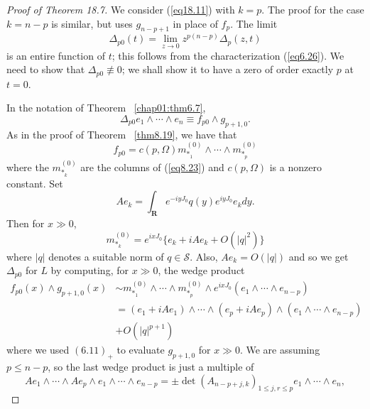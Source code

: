 \documentclass{surv-l}
\theoremstyle{plain}
\theoremstyle{definition}
\numberwithin{equation}{chapter}
\begin{document}
\begin{proof}[Proof of Theorem 18.7]
We consider (\ref{eq18.11}) with $k=p$. The proof for the case $k=n-p$ is similar, but uses $g_{n-p+1}$ in place of $f_{p}$. The limit
\setcounter{equation}{13}
\begin{equation}\label{eq18.14}
\Delta_{p0}(t)=\lim_{z\rightarrow 0}z^{p(n-p)}\Delta_{p}(z,t)
\end{equation}
is an entire function of $t$; this follows from the characterization (\ref{eq6.26}). We need to show that $\Delta_{p0}\not\equiv 0$; we shall show it to have a zero of order exactly $p$ at $t=0$.

In the notation of Theorem ~\ref{chap01:thm6.7},
\begin{equation*}
\Delta_{p0}e_{1}\wedge\cdots\wedge e_{n}\equiv f_{p0}\wedge g_{p+1,0}.
\end{equation*}
As in the proof of Theorem ~\ref{thm8.19}, we have that
\begin{equation*}
f_{p0}=c(p,\Omega)m_{*_{1}}^{(0)}\wedge\cdots\wedge m_{*_{p}}^{(0)}
\end{equation*}
where the $m_{*_{k}}^{(0)}$ are the columns of (\ref{eq8.23}) and $c(p,\Omega)$ is a nonzero constant. Set
\begin{equation}\label{eq18.15}
Ae_{k}=\int_{\mathbf{R}}e^{-iyJ_{0}}q(y)e^{iyJ_{0}}e_{k}dy.
\end{equation}
Then for $x\gg 0$,
\begin{equation*}
m_{*_{k}}^{(0)}=e^{ixJ_{0}}\{e_{k}+iAe_{k}+O(|q|^{2})\}
\end{equation*}
where $|q|$ denotes a suitable norm of $q\in \mathscr{S}$. Also, $Ae_{k}=O(|q|)$ and so we get $\Delta_{p0}$ for $L$ by computing, for $x\gg 0$, the wedge product
\begin{align*}
f_{p0}(x)\wedge g_{p+1,0}(x)&\sim m_{*_{1}}^{(0)}\wedge\cdots\wedge m_{*_{p}}^{(0)}\wedge e^{ixJ_{0}}(e_{1}\wedge \cdots\wedge e_{n-p})\\
&=(e_{1}+iAe_{1})\wedge\cdots\wedge(e_{p}+iAe_{p})\wedge(e_{1}\wedge\cdots\wedge e_{n-p})\\
&+O(|q|^{p+1})
\end{align*}
where we used $(6.11)_{+}$ to evaluate $g_{p+1,0}$ for $x \gg 0$. We are assuming $p\leq n -p$, so the last wedge product is just a multiple of
\begin{equation*}
Ae_{1}\wedge\cdots\wedge Ae_{p}\wedge e_{1}\wedge\cdots\wedge e_{n-p}=\pm\det(A_{n-p+j,k})_{1\leq j,r\leq p}e_{1}\wedge \cdots\wedge e_{n},
\end{equation*}

\end{proof}
\end{document}
